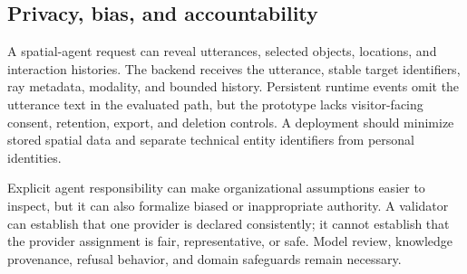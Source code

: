 \subsection{Privacy, bias, and accountability}

A spatial-agent request can reveal utterances, selected objects, locations, and
interaction histories.  The backend receives the utterance, stable target
identifiers, ray metadata, modality, and bounded history.  Persistent runtime
events omit the utterance text in the evaluated path, but the prototype lacks
visitor-facing consent, retention, export, and deletion controls.  A
deployment should minimize stored spatial data and separate technical entity
identifiers from personal identities.

Explicit agent responsibility can make organizational assumptions easier to
inspect, but it can also formalize biased or inappropriate authority.  A
validator can establish that one provider is declared consistently; it cannot
establish that the provider assignment is fair, representative, or safe.
Model review, knowledge provenance, refusal behavior, and domain safeguards
remain necessary.
